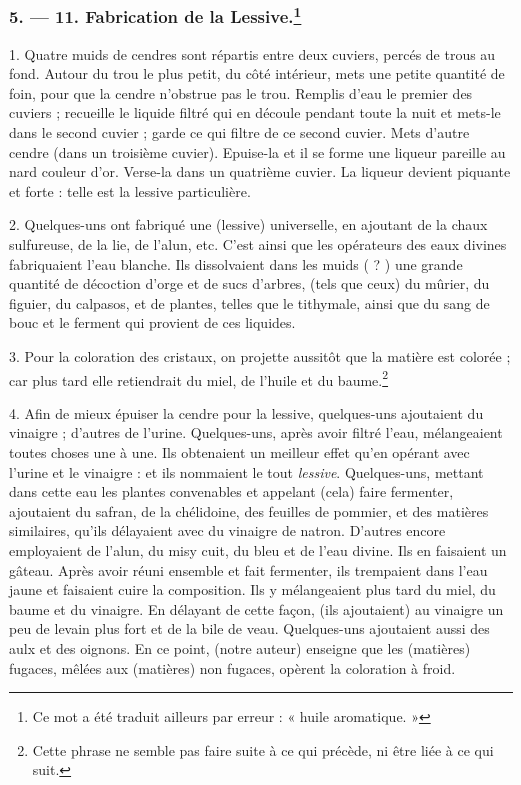 \documentclass[a4paper, 11pt, oneside, polutonikogreek, french]{article}
\begin{document}
\bigskip
\centerline{\EightStarTaper}
\centerline{\EightStarTaper\EightStarTaper}
\bigskip

\subsubsection[5. --- 11. Fabrication de la Lessive.]{5. --- 11. Fabrication de la Lessive.\footnote{Ce mot a été traduit ailleurs par erreur : « huile aromatique. »}}

1. Quatre muids de cendres sont répartis entre deux cuviers, percés de trous au fond. Autour du trou le plus petit, du côté intérieur, mets une petite quantité de foin, pour que la cendre n'obstrue pas le trou. Remplis d'eau le premier des cuviers ; recueille le liquide filtré qui en découle pendant toute la nuit et mets-le dans le second cuvier ; garde ce qui filtre de ce second cuvier. Mets d'autre cendre (dans un troisième cuvier). Epuise-la et il se forme une liqueur pareille au nard couleur d'or. Verse-la dans un quatrième cuvier. La liqueur devient piquante et forte : telle est la lessive particulière.

2. Quelques-uns ont fabriqué une (lessive) universelle, en ajoutant de la chaux sulfureuse, de la lie, de l'alun, etc. C'est ainsi que les opérateurs des eaux divines fabriquaient l'eau blanche. Ils dissolvaient dans les muids ( ? ) une grande quantité de décoction d'orge et de sucs d'arbres, (tels que ceux) du mûrier, du figuier, du calpasos, et de plantes, telles que le tithymale, ainsi que du sang de bouc et le ferment qui provient de ces liquides.

3. Pour la coloration des cristaux, on projette aussitôt que la matière est colorée ; car plus tard elle retiendrait du miel, de l'huile et du baume.\footnote{Cette phrase ne semble pas faire suite à ce qui précède, ni être liée à ce qui suit.}

4. Afin de mieux épuiser la cendre pour la lessive, quelques-uns ajoutaient du vinaigre ; d'autres de l'urine. Quelques-uns, après avoir filtré l'eau, mélangeaient toutes choses une à une. Ils obtenaient un meilleur effet qu'en opérant avec l'urine et le vinaigre : et ils nommaient le tout \emph{lessive}. Quelques-uns, mettant dans cette eau les plantes convenables et appelant (cela) faire fermenter, ajoutaient du safran, de la chélidoine, des feuilles de pommier, et des matières similaires, qu'ils délayaient avec du vinaigre de natron. D'autres encore employaient de l'alun, du misy cuit, du bleu et de l'eau divine. Ils en faisaient un gâteau. Après avoir réuni ensemble et fait fermenter, ils trempaient dans l'eau jaune et faisaient cuire la composition. Ils y mélangeaient plus tard du miel, du baume et du vinaigre. En délayant de cette façon, (ils ajoutaient) au vinaigre un peu de levain plus fort et de la bile de veau. Quelques-uns ajoutaient aussi des aulx et des oignons. En ce point, (notre auteur) enseigne que les (matières) fugaces, mêlées aux (matières) non fugaces, opèrent la coloration à froid.
\end{document}
